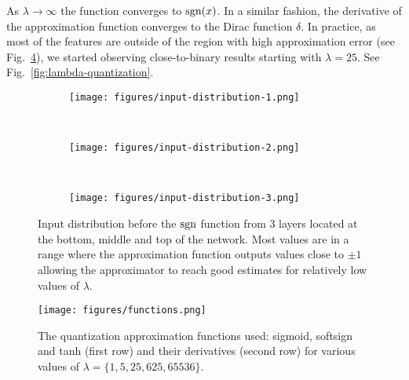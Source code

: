 \documentclass[10pt,twocolumn,letterpaper]{article}
\begin{document}
As $\lambda\to\infty$ the function converges to $\operatorname{sgn}(x)$. In a similar fashion, the derivative of the approximation function converges to the Dirac function $\delta$. In practice, as most of the features are outside of the region with high approximation error (see Fig.~\ref{fig:input-distribution}), we started observing close-to-binary results starting with $\lambda=25$. See Fig.~\ref{fig:lambda-quantization}.

\begin{figure*}[!htbp]
    \centering
    \begin{subfigure}[t]{0.3\textwidth}
    \texttt{[image: figures/input-distribution-1.png]}
    \label{fig:input-dist-1}
    \end{subfigure}
    ~
    \begin{subfigure}[t]{0.299\textwidth}
    \texttt{[image: figures/input-distribution-2.png]}
    \label{fig:input-dist-2}
    \end{subfigure}
     ~
     \begin{subfigure}[t]{0.303\textwidth}
    \texttt{[image: figures/input-distribution-3.png]}
    \label{fig:input-dist-3}
    \end{subfigure}
    
    \caption{Input distribution before the $\operatorname{sgn}$ function from 3 layers located at the bottom, middle and top of the network. Most values are in a range  where the approximation function outputs values close to $\pm{1}$ allowing the approximator to reach good estimates for relatively low values of $\lambda$.}
    \label{fig:input-distribution}
\end{figure*}

\begin{figure}[!htbp]
    \centering
    \texttt{[image: figures/functions.png]}
    \caption{The quantization approximation functions used: sigmoid, softsign and tanh (first row) and their derivatives (second row) for various values of $\lambda=\{1,5,25,625,65536\}$.}
    \label{fig:functions-plot}
    \vspace{5pt}
\end{figure}
\end{document}
